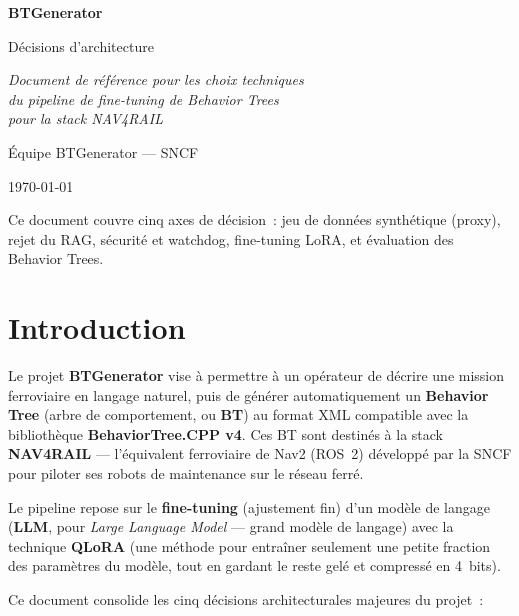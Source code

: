 \documentclass[a4paper,11pt]{article}
\begin{document}
\begin{titlepage}
\centering
\vspace*{3cm}
{\Huge\bfseries BTGenerator\par}
\vspace{0.5cm}
{\LARGE Décisions d'architecture\par}
\vspace{1.5cm}
{\large\itshape Document de référence pour les choix techniques\\
du pipeline de fine-tuning de Behavior Trees\\
pour la stack NAV4RAIL\par}
\vspace{2cm}
{\large Équipe BTGenerator --- SNCF\par}
\vspace{1cm}
{\large\today\par}
\vfill
{\small Ce document couvre cinq axes de décision~: jeu de données
synthétique (proxy), rejet du RAG, sécurité et watchdog, fine-tuning
LoRA, et évaluation des Behavior Trees.}
\end{titlepage}

\tableofcontents
\newpage

\section{Introduction}

Le projet \textbf{BTGenerator} vise à permettre à un opérateur de décrire une
mission ferroviaire en langage naturel, puis de générer automatiquement un
\textbf{Behavior Tree} (arbre de comportement, ou \textbf{BT}) au format XML
compatible avec la bibliothèque \textbf{BehaviorTree.CPP v4}. Ces BT sont
destinés à la stack \textbf{NAV4RAIL} --- l'équivalent ferroviaire de Nav2
(ROS~2) développé par la SNCF pour piloter ses robots de maintenance sur le
réseau ferré.

Le pipeline repose sur le \textbf{fine-tuning} (ajustement fin) d'un modèle
de langage (\textbf{LLM}, pour \emph{Large Language Model} --- grand modèle
de langage) avec la technique \textbf{QLoRA} (une méthode pour entraîner
seulement une petite fraction des paramètres du modèle, tout en gardant le
reste gelé et compressé en 4~bits).

Ce document consolide les cinq décisions architecturales majeures du projet~:
\end{document}
